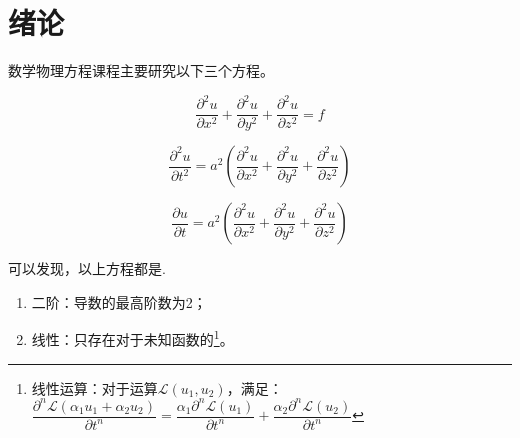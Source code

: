\chapter{绪论}
数学物理方程课程主要研究以下三个方程。

\begin{equation}
	\frac{\partial^2u}{\partial x^2} + \frac{\partial^2 u}{\partial y^2} +\frac{\partial^2 u}{\partial z^2} = f
\end{equation}

\begin{equation}
	\frac{\partial^2 u}{\partial t^2} = a^2\left(	\frac{\partial^2u}{\partial x^2} + \frac{\partial^2 u}{\partial y^2} +\frac{\partial^2 u}{\partial z^2} \right)
\end{equation}

\begin{equation}
		\frac{\partial u}{\partial t} = a^2\left(	\frac{\partial^2u}{\partial x^2} + \frac{\partial^2 u}{\partial y^2} +\frac{\partial^2 u}{\partial z^2} \right)
\end{equation}

可以发现，以上方程都是.
\begin{enumerate}[\hspace*{3em}$-$]
	\item 二阶：导数的最高阶数为2；
	\item 线性：只存在对于未知函数的\footnote{线性运算：对于运算$\mathcal{L}(u_1,u_2)$，满足：$\dfrac{\partial^n \mathcal{L}(\alpha_1 u_1+\alpha_2 u_2)}{\partial t^n} = \dfrac{\alpha_1 \partial^n \mathcal{L}(u_1)}{\partial t^n}+ \dfrac{\alpha_2 \partial^n \mathcal{L}(u_2)}{\partial t^n}$}。
\end{enumerate}

